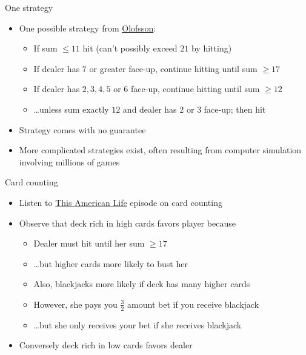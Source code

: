 \documentclass[handout]{beamer}
\theoremstyle{definition}
\begin{document}
\begin{frame}{One strategy}
\begin{itemize}
\item One possible strategy from
\href{http://www.wiley.com/WileyCDA/WileyTitle/productCd-0470624450.html}
{\color{blue}Olofsson}:
\begin{itemize}
\item If sum $\le 11$ hit (can't possibly exceed $21$ by hitting)
\item If dealer has $7$ or greater face-up, continue hitting until
sum $\ge 17$
\item If dealer has $2,3,4,5$ or $6$ face-up, continue hitting
until sum $\ge 12$
\item \dots unless sum exactly $12$ and dealer has $2$ or $3$
face-up; then hit
\end{itemize}
\item Strategy comes with no guarantee
\item More complicated strategies exist, often resulting
from computer simulation involving millions of games
\end{itemize}
\end{frame}

\begin{frame}{Card counting}
\begin{itemize}
\item Listen to
\href{http://www.thisamericanlife.org/radio-archives/episode/466/blackjack}
{\color{blue}This American Life} episode on card counting
\item Observe that deck rich in high cards favors player because
\begin{itemize}
\item Dealer must hit until her sum $\ge 17$
\item \dots but higher cards more likely to bust her
\item Also, blackjacks more likely if deck has many higher cards
\item However, she pays you $\frac{3}{2}$ amount bet
if you receive blackjack
\item \dots but she only receives your bet if she receives blackjack
\end{itemize}
\item Conversely deck rich in low cards favors dealer
\end{itemize}
\end{frame}
\end{document}
